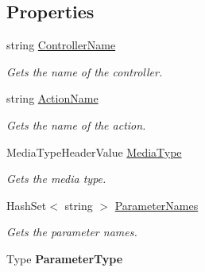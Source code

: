 \subsection*{Properties}
\begin{DoxyCompactItemize}
\item 
string \hyperlink{class__1aarsproeve_web_service_1_1_areas_1_1_help_page_1_1_help_page_sample_key_a83d3909e7f8daf7ab92060c21afef237}{Controller\+Name}
\begin{DoxyCompactList}\small\item\em Gets the name of the controller. \end{DoxyCompactList}\item 
string \hyperlink{class__1aarsproeve_web_service_1_1_areas_1_1_help_page_1_1_help_page_sample_key_abb5930ab215393929bd5fc488c551f32}{Action\+Name}
\begin{DoxyCompactList}\small\item\em Gets the name of the action. \end{DoxyCompactList}\item 
Media\+Type\+Header\+Value \hyperlink{class__1aarsproeve_web_service_1_1_areas_1_1_help_page_1_1_help_page_sample_key_a3db7a3c071a64389856208253ce6a8c3}{Media\+Type}
\begin{DoxyCompactList}\small\item\em Gets the media type. \end{DoxyCompactList}\item 
Hash\+Set$<$ string $>$ \hyperlink{class__1aarsproeve_web_service_1_1_areas_1_1_help_page_1_1_help_page_sample_key_a2e76cfdbf00172ca1a0dedc0073aeb7b}{Parameter\+Names}
\begin{DoxyCompactList}\small\item\em Gets the parameter names. \end{DoxyCompactList}\item 
\hypertarget{class__1aarsproeve_web_service_1_1_areas_1_1_help_page_1_1_help_page_sample_key_a06bee89f6540c17854e99d046dde0163}{}Type {\bfseries Parameter\+Type}\label{class__1aarsproeve_web_service_1_1_areas_1_1_help_page_1_1_help_page_sample_key_a06bee89f6540c17854e99d046dde0163}


\end{DoxyCompactItemize}
